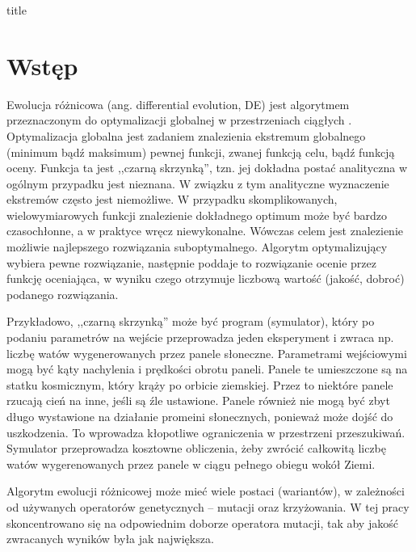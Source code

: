 \documentclass[a4paper,onecolumn,oneside,12pt,wide,floatssmall]{mwrep}
\theoremstyle{definition}
\theoremstyle{plain}%
\theoremstyle{remark}
\begin{document}
\renewcommand*\lstlistingname{Wydruk}
\renewcommand*\lstlistlistingname{Spis wydruków}

\renewcommand{\baselinestretch}{1.0}
\raggedbottom
 {title}

\tableofcontents

\newpage
{}
\setcounter{page}{1}

\chapter{Wstęp}

Ewolucja różnicowa (ang. differential evolution, DE) jest algorytmem przeznaczonym 
do optymalizacji globalnej 
w przestrzeniach ciągłych \cite{storn}. Optymalizacja globalna jest zadaniem znalezienia ekstremum 
globalnego (minimum bądź maksimum) pewnej funkcji, zwanej funkcją celu, bądź funkcją oceny. 
Funkcja ta jest ,,czarną skrzynką'', tzn. jej dokładna postać analityczna w ogólnym przypadku 
jest nieznana. W związku z tym analityczne wyznaczenie ekstremów często jest niemożliwe. W przypadku 
skomplikowanych, wielowymiarowych funkcji znalezienie dokładnego optimum może być bardzo czasochłonne, 
a w praktyce wręcz niewykonalne. Wówczas celem jest znalezienie możliwie najlepszego rozwiązania
suboptymalnego. Algorytm optymalizujący wybiera pewne rozwiązanie, następnie poddaje to rozwiązanie 
ocenie przez funkcję oceniająca, w wyniku czego otrzymuje liczbową wartość (jakość, dobroć) 
podanego rozwiązania. 

Przykładowo, ,,czarną skrzynką'' może być program (symulator), który po podaniu 
parametrów na wejście przeprowadza jeden eksperyment i zwraca np. liczbę watów wygenerowanych
przez panele słoneczne. Parametrami wejściowymi mogą być kąty nachylenia i prędkości obrotu paneli. 
Panele te umieszczone są na statku kosmicznym, który krąży po orbicie ziemskiej.
Przez to niektóre panele rzucają cień na inne, jeśli są źle ustawione. Panele również nie mogą być 
zbyt długo wystawione na działanie promeini słonecznych, ponieważ może dojść do uszkodzenia. 
To wprowadza kłopotliwe ograniczenia w przestrzeni przeszukiwań.
Symulator przeprowadza kosztowne obliczenia, żeby zwrócić całkowitą liczbę watów wygerenowanych
przez panele w ciągu pełnego obiegu wokół Ziemi. 



Algorytm ewolucji różnicowej może mieć wiele postaci (wariantów), w zależności od używanych
operatorów genetycznych -- mutacji oraz krzyżowania. 
W tej pracy skoncentrowano się na odpowiednim doborze operatora mutacji, 
tak aby jakość zwracanych wyników była jak największa.
\end{document}
